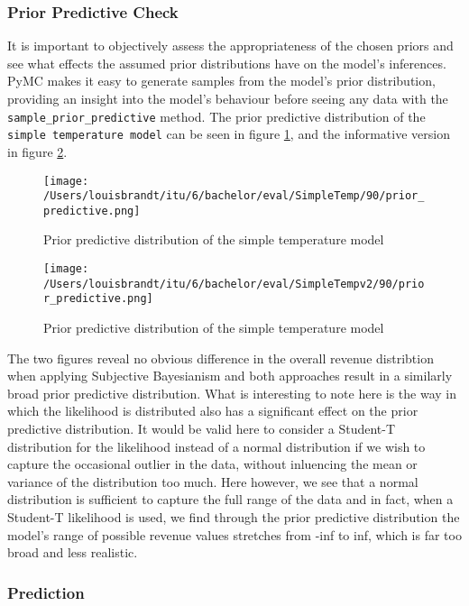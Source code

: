 \subsubsection{Prior Predictive Check}

It is important to objectively assess the appropriateness of the chosen priors
and see what effects the assumed prior distributions have on the model's
inferences. PyMC makes it easy to generate samples from the model's prior 
distribution, providing an insight into the model's behaviour before seeing any data with 
the \texttt{sample\_prior\_predictive} method. The prior predictive distribution of the
\texttt{simple temperature model} can be seen in figure \ref{fig:temp_model_prior_predictive}, 
and the informative version in figure \ref{fig:temp_model_prior_predictive_informative}.

\begin{figure}[h]
  \centering
  \texttt{[image: /Users/louisbrandt/itu/6/bachelor/eval/SimpleTemp/90/prior\_predictive.png]}
  \caption{Prior predictive distribution of the simple temperature model}
  \label{fig:temp_model_prior_predictive}
\end{figure}
\begin{figure}[h]
  \centering
  \texttt{[image: /Users/louisbrandt/itu/6/bachelor/eval/SimpleTempv2/90/prior\_predictive.png]}
  \caption{Prior predictive distribution of the simple temperature model}
  \label{fig:temp_model_prior_predictive_informative}
\end{figure}

The two figures reveal no obvious difference in the overall revenue distribtion
when applying Subjective Bayesianism and both approaches result in a similarly 
broad prior predictive distribution. 
What is interesting to note here is the way in which the likelihood is
distributed also has a significant effect on the prior predictive distribution. It
would be valid here to consider a Student-T distribution for the likelihood
instead of a normal distribution if we wish to capture the occasional outlier
in the data, without inluencing the mean or variance of the distribution too much. Here
however, we see that a normal distribution is sufficient to capture the full
range of the data and in fact, when a Student-T likelihood is used, we find
through the prior predictive distribution the model's range of possible revenue
values stretches from -inf to inf, which is far too broad and less realistic.

\subsubsection{Prediction}

